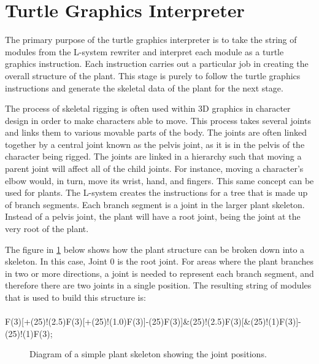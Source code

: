 \section{Turtle Graphics Interpreter} \label{turtle graphics section}

The primary purpose of the turtle graphics interpreter is to take the string of modules from the L-system rewriter and interpret each module as a turtle graphics instruction. Each instruction carries out a particular job in creating the overall structure of the plant. This stage is purely to follow the turtle graphics instructions and generate the skeletal data of the plant for the next stage.

The process of skeletal rigging is often used within 3D graphics in character design in order to make characters able to move. This process takes several joints and links them to various movable parts of the body. The joints are often linked together by a central joint known as the pelvis joint, as it is in the pelvis of the character being rigged. The joints are linked in a hierarchy such that moving a parent joint will affect all of the child joints. For instance, moving a character's elbow would, in turn, move its wrist, hand, and fingers. This same concept can be used for plants. The L-system creates the instructions for a tree that is made up of branch segments. Each branch segment is a joint in the larger plant skeleton. Instead of a pelvis joint, the plant will have a root joint, being the joint at the very root of the plant. 

The figure in \ref{skeleton diagram} below shows how the plant structure can be broken down into a skeleton. In this case, Joint 0 is the root joint. For areas where the plant branches in two or more directions, a joint is needed to represent each branch segment, and therefore there are two joints in a single position. The resulting string of modules that is used to build this structure is: \\
\\
F(3)[+(25)!(2.5)F(3)[+(25)!(1.0)F(3)]-(25)F(3)]\&(25)!(2.5)F(3)[\&(25)!(1)F(3)]-(25)!(1)F(3);

\begin{figure}[htbp]
	{\centering
		\vspace{7px}
		\setlength{\fboxrule}{1pt}
		\caption{Diagram of a simple plant skeleton showing the joint positions.} \label{skeleton diagram}
	}
\end{figure}
\FloatBarrier

